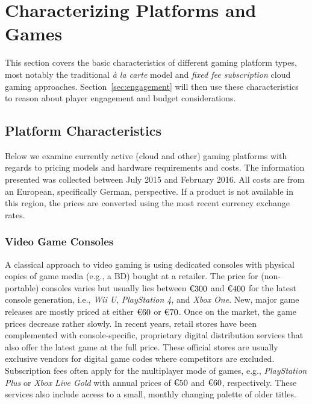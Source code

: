 \section{Characterizing Platforms and Games}
\label{sec:background}

This section covers the basic characteristics of different gaming platform types, most notably the traditional  \textit{à la carte} model and \textit{fixed fee subscription} cloud gaming approaches.%
Section~\ref{sec:engagement} will then use these characteristics to reason about player engagement and budget considerations.

\subsection{Platform Characteristics}

Below we examine currently active (cloud and other) gaming platforms with regards to pricing models and hardware requirements and costs. The information presented was collected between July 2015 and February 2016. All costs are from an European, specifically German, perspective. If a product is not available in this region, the prices are converted using the most recent currency exchange rates.

\subsubsection{Video Game Consoles}

A classical approach to video gaming is using dedicated consoles with physical copies of game media (e.g., a BD) bought at a retailer. The price for (non-portable) consoles varies but usually lies between $\text{\texteuro} 300$ and $\text{\texteuro} 400$ for the latest console generation, i.e., \textit{Wii U}, \textit{PlayStation 4}, and \textit{Xbox One}. New, major game releases are mostly priced at either $\text{\texteuro} 60$ or $\text{\texteuro} 70$. Once on the market, the game prices decrease rather slowly. In recent years, retail stores have been complemented with console-specific, proprietary digital distribution services that also offer the latest game at the full price. These official stores are usually exclusive vendors for digital game codes where competitors are excluded.
Subscription fees often apply for the multiplayer mode of games, e.g., \textit{PlayStation Plus} or \textit{Xbox Live Gold} with annual prices of $\text{\texteuro} 50$ and $\text{\texteuro} 60$, respectively. These services also include access to a small, monthly changing palette of older titles.

